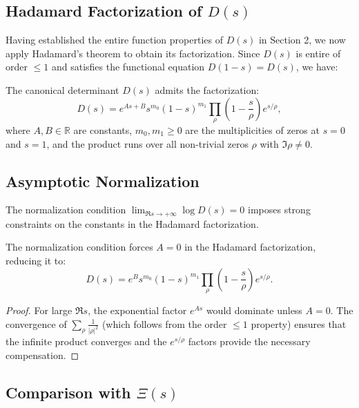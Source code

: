 \subsection{Hadamard Factorization of \( D(s) \)}

Having established the entire function properties of \( D(s) \) in Section 2, we now apply Hadamard's theorem to obtain its factorization. Since \( D(s) \) is entire of order \( \leq 1 \) and satisfies the functional equation \( D(1-s) = D(s) \), we have:

\begin{theorem}
The canonical determinant \( D(s) \) admits the factorization:
\[
D(s) = e^{As + B} s^{m_0} (1-s)^{m_1} \prod_{\rho} \left(1 - \frac{s}{\rho}\right) e^{s/\rho},
\]
where \( A, B \in \mathbb{R} \) are constants, \( m_0, m_1 \geq 0 \) are the multiplicities of zeros at \( s = 0 \) and \( s = 1 \), and the product runs over all non-trivial zeros \( \rho \) with \( \Im \rho \neq 0 \).
\end{theorem}

\subsection{Asymptotic Normalization}

The normalization condition \( \lim_{\Re s \to +\infty} \log D(s) = 0 \) imposes strong constraints on the constants in the Hadamard factorization.

\begin{proposition}
The normalization condition forces \( A = 0 \) in the Hadamard factorization, reducing it to:
\[
D(s) = e^B s^{m_0} (1-s)^{m_1} \prod_{\rho} \left(1 - \frac{s}{\rho}\right) e^{s/\rho}.
\]
\end{proposition}

\begin{proof}
For large \( \Re s \), the exponential factor \( e^{As} \) would dominate unless \( A = 0 \). The convergence of \( \sum_\rho \frac{1}{|\rho|^2} \) (which follows from the order \( \leq 1 \) property) ensures that the infinite product converges and the \( e^{s/\rho} \) factors provide the necessary compensation.
\end{proof}

\subsection{Comparison with \( \Xi(s) \)}

